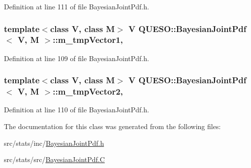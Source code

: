 Definition at line 111 of file Bayesian\-Joint\-Pdf.\-h.

\hypertarget{class_q_u_e_s_o_1_1_bayesian_joint_pdf_af4252d2628298423a60335eef72136c6}{
\subsubsection[{m\-\_\-tmp\-Vector1}]{\setlength{\rightskip}{0pt plus 5cm}template$<$class V, class M$>$ V {\bf Q\-U\-E\-S\-O\-::\-Bayesian\-Joint\-Pdf}$<$ V, M $>$\-::m\-\_\-tmp\-Vector1\hspace{0.3cm}{\ttfamily [mutable]}, {\ttfamily [protected]}}}\label{class_q_u_e_s_o_1_1_bayesian_joint_pdf_af4252d2628298423a60335eef72136c6}


Definition at line 109 of file Bayesian\-Joint\-Pdf.\-h.

\hypertarget{class_q_u_e_s_o_1_1_bayesian_joint_pdf_a2c81721bddf0ffd5547751f1a8221a5d}{
\subsubsection[{m\-\_\-tmp\-Vector2}]{\setlength{\rightskip}{0pt plus 5cm}template$<$class V, class M$>$ V {\bf Q\-U\-E\-S\-O\-::\-Bayesian\-Joint\-Pdf}$<$ V, M $>$\-::m\-\_\-tmp\-Vector2\hspace{0.3cm}{\ttfamily [mutable]}, {\ttfamily [protected]}}}\label{class_q_u_e_s_o_1_1_bayesian_joint_pdf_a2c81721bddf0ffd5547751f1a8221a5d}


Definition at line 110 of file Bayesian\-Joint\-Pdf.\-h.



The documentation for this class was generated from the following files\-:\begin{DoxyCompactItemize}
\item 
src/stats/inc/\hyperlink{_bayesian_joint_pdf_8h}{Bayesian\-Joint\-Pdf.\-h}\item 
src/stats/src/\hyperlink{_bayesian_joint_pdf_8_c}{Bayesian\-Joint\-Pdf.\-C}\end{DoxyCompactItemize}

